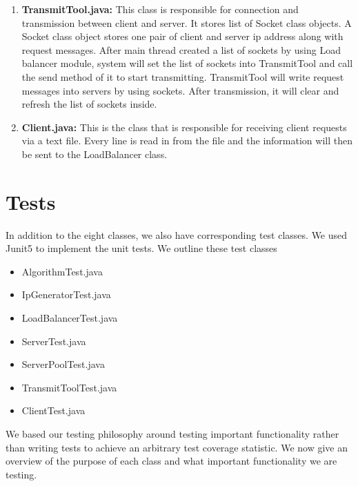 \documentclass[12pt]{article}
\begin{document}
\begin{enumerate}
   \item \textbf{TransmitTool.java: }This class is responsible for connection and transmission between client and server. It stores list of Socket class objects. A Socket class object stores one pair of client and server ip address along with request messages. After main thread created a list of sockets by using Load balancer module, system will set the list of sockets into TransmitTool and call the send method of it to start transmitting. TransmitTool will write request messages into servers by using sockets. After transmission, it will clear and refresh the list of sockets inside. 
   \item \textbf{Client.java: }This is the class that is responsible for receiving client requests via a text file. Every line is read in from the file and the information will then be sent to the LoadBalancer class.
\end{enumerate}

\section{Tests}
In addition to the eight classes, we also have corresponding test classes. We used Junit5 to implement the unit tests. We outline these test classes 
\begin{itemize}
    \item AlgorithmTest.java
    \item IpGeneratorTest.java
    \item LoadBalancerTest.java
    \item ServerTest.java
    \item ServerPoolTest.java
    \item TransmitToolTest.java
    \item ClientTest.java
\end{itemize}

We based our testing philosophy around testing important functionality rather than writing tests to achieve an arbitrary test coverage statistic. We now give an overview of the purpose of each class and what important functionality we are testing.
\end{document}
